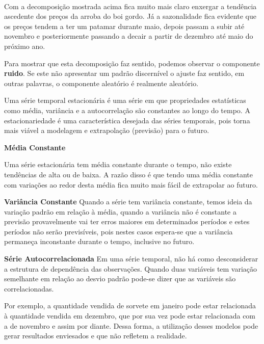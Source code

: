 \documentclass[11pt]{article}
\begin{document}
    \begin{center}
    \end{center}
    { \hspace*{\fill} \\}
    
    Com a decomposição mostrada acima fica muito mais claro enxergar a
tendência ascedente dos preços da arroba do boi gordo. Já a sazonalidade
fica evidente que os preços tendem a ter um patamar durante maio, depois
passam a subir até novembro e posteriormente passando a decair a partir
de dezembro até maio do próximo ano.

Para mostrar que esta decomposição faz sentido, podemos observar o
componente \textbf{ruido}. Se este não apresentar um padrão discernível
o ajuste faz sentido, em outras palavras, o componente aleatório é
realmente aleatório.

    Uma série temporal estacionária é uma série em que propriedades
estatísticas como média, variância e a autocorrelação são constantes ao
longo do tempo. A estacionariedade é uma característica desejada das
séries temporais, pois torna mais viável a modelagem e extrapolação
(previsão) para o futuro.

\textbf{Média Constante}

Uma série estacionária tem média constante durante o tempo, não existe
tendências de alta ou de baixa. A razão disso é que tendo uma média
constante com variações ao redor desta média fica muito mais fácil de
extrapolar ao futuro.

\textbf{Variância Constante} Quando a série tem variância constante,
temos ideia da variação padrão em relação à média, quando a variância
não é constante a previsão provavelmente vai ter erros maiores em
determinados períodos e estes períodos não serão previsíveis, pois
nestes casos espera-se que a variância permaneça inconstante durante o
tempo, inclusive no futuro.

\textbf{Série Autocorrelacionada} Em uma série temporal, não há como
desconsiderar a estrutura de dependência das observações. Quando duas
variáveis tem variação semelhante em relação ao desvio padrão pode-se
dizer que as variáveis são correlacionadas.

Por exemplo, a quantidade vendida de sorvete em janeiro pode estar
relacionada à quantidade vendida em dezembro, que por sua vez pode estar
relacionada com a de novembro e assim por diante. Dessa forma, a
utilização desses modelos pode gerar resultados enviesados e que não
refletem a realidade.
\end{document}
